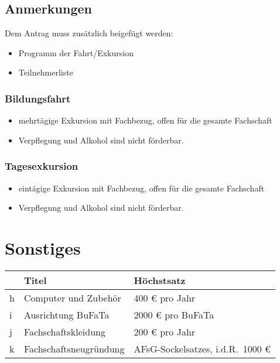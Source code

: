 \documentclass{article}
\begin{document}
    \subsection{Anmerkungen}
    Dem Antrag muss zusätzlich beigefügt werden:
        \begin{itemize}
            \item Programm der Fahrt/Exkursion
            \item Teilnehmerliste
        \end{itemize}
        \subsubsection{Bildungsfahrt}
            \begin{itemize}
                \item  mehrtägige Exkursion mit Fachbezug, offen für die gesamte Fachschaft
                \item Verpflegung und Alkohol sind nicht förderbar.
            \end{itemize}
        
        \subsubsection{Tagesexkursion}
            \begin{itemize}
                \item eintägige Exkursion mit Fachbezug, offen für die gesamte Fachschaft
                \item Verpflegung und Alkohol sind nicht förderbar.
            \end{itemize}
            

    
\section{Sonstiges}
    \setlength\extrarowheight{2mm} \sffamily
    \begin{tabular}{l||L{6cm}|L{7cm}}
        &\textbf{Titel} & \textbf{Höchstsatz}\\[1mm] \hline \hline
        h&
        Computer und Zubehör &
        400 € pro Jahr \\[1mm] \hline
         

         
        i&
        Ausrichtung BuFaTa  &
        2000 € pro BuFaTa \\[1mm] \hline
        
        j&
        Fachschaftskleidung&
        200 € pro Jahr \\[1mm] \hline
         
        k&
        Fachschaftsneugründung &
        AFsG-Sockelsatzes, i.d.R.\ 1000 € \\[1mm]
    \end{tabular}
    \rmfamily
\end{document}
